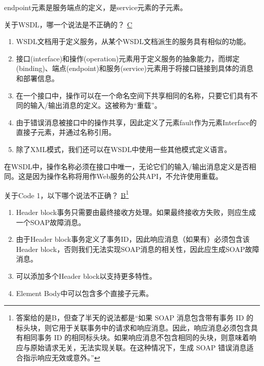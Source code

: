 \begin{solution}
endpoint元素是服务端点的定义，是service元素的子元素。
\end{solution}


\begin{problem}
关于WSDL，哪一个说法是不正确的？
\uline{C}
    \begin{enumerate}[label=\Alph*.]
        \item WSDL文档用于定义服务，从某个WSDL文档派生的服务具有相似的功能。
        \item 接口(interface)和操作(operation)元素用于定义服务的抽象能力，而绑定(binding)、端点(endpoint)和服务(service)元素用于将接口链接到具体的消息和部署信息。
        \item 在一个接口中，操作可以在一个命名空间下共享相同的名称，只要它们具有不同的输入/输出消息的定义。这被称为“重载”。
        \item 由于错误消息被接口中的操作共享，因此定义了元素fault作为元素Interface的直接子元素，并通过名称引用。
        \item 除了XML模式，我们还可以在WSDL中使用一些其他模式定义语言。
    \end{enumerate}
\end{problem}

\begin{solution}
在WSDL中，操作名称必须在接口中唯一，无论它们的输入/输出消息定义是否相同。这是因为操作名称将用作Web服务的公共API，不允许使用重载。
\end{solution}


\begin{problem}
关于Code 1，以下哪个说法不正确？
\uline{B}\footnote{答案给的是B，但查了半天的说法都是“如果 SOAP 消息包含带有事务 ID 的标头块，则它用于关联事务中的请求和响应消息。因此，响应消息必须包含具有相同事务 ID 的相同标头块。如果响应消息不包含相同的头块，则意味着响应与原始请求无关，无法实现关联。在这种情况下，生成 SOAP 错误消息适合指示响应无效或意外。”}
    \begin{enumerate}[label=\Alph*.]
        \item Header block事务只需要由最终接收方处理。如果最终接收方失败，则应生成一个SOAP故障消息。
        \item 由于Header block事务定义了事务ID，因此响应消息（如果有）必须包含该Header block，否则我们无法实现SOAP消息的相关性，因此应生成SOAP故障消息。
        \item 可以添加多个Header block以支持更多特性。
        \item Element Body中可以包含多个直接子元素。
    \end{enumerate}
\end{problem}


